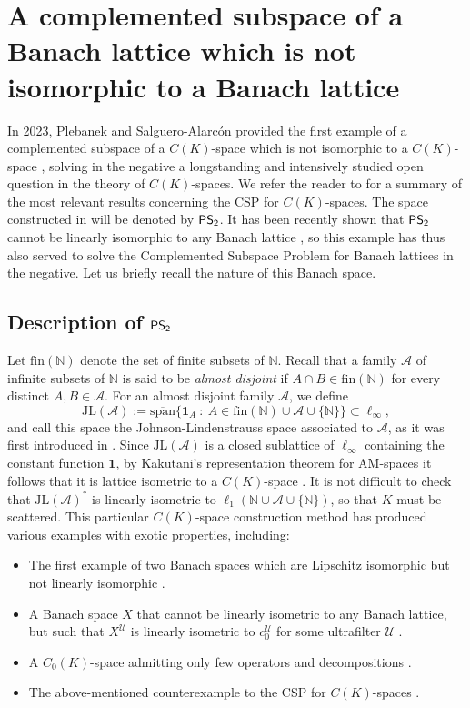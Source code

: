 \documentclass[11pt]{amsart}
\theoremstyle{definition}
\numberwithin{equation}{section}
\newcommand\PS{{\normalfont\textsf{PS}}_\textsf{2}}
\begin{document}
\section{A complemented subspace of a Banach lattice which is not isomorphic to a Banach lattice}\label{sec:PS2}



In 2023, Plebanek and Salguero-Alarcón provided the first example of a complemented subspace of a $C(K)$-space which is not isomorphic to a $C(K)$-space \cite{PS2}, solving in the negative a longstanding and intensively studied open question in the theory of $C(K)$-spaces. We refer the reader to \cite[Section 5]{Ros} for a summary of the most relevant results concerning the CSP for $C(K)$-spaces. The space constructed in \cite{PS2} will be denoted by $\PS$. It has been recently shown that $\PS$ cannot be linearly isomorphic to any Banach lattice \cite[Theorem 4.4]{dHMST23}, so this example has thus also served to solve the Complemented Subspace Problem for Banach lattices in the negative. Let us briefly recall the nature of this Banach space.

\subsection{Description of $\PS$} Let $\text{fin}(\mathbb N)$ denote the set of finite subsets of $\mathbb N$. Recall that a family $\mathcal{A}$ of infinite subsets of $\mathbb{N}$ is said to be \textit{almost disjoint} if $A\cap B\in \text{fin}(\mathbb N)$ for every distinct $A, B\in\mathcal{A}$. For an almost disjoint family $\mathcal{A}$, we define
$$
\text{JL}(\mathcal{A}):=\overline{\text{span}}\bigl\{\mathbf{1}_A\::\:A\in \text{fin}(\mathbb{N})\cup\mathcal{A}\cup\{\mathbb{N}\}\bigr\}\subset \ell_\infty,
$$
and call this space the Johnson-Lindenstrauss space associated to $\mathcal{A}$, as it was first introduced in \cite[Example 2]{JL1974}. Since $\text{JL}(\mathcal{A})$ is a closed sublattice of $\ell_\infty$ containing the constant function $\mathbf{1}$, by Kakutani's representation theorem for AM-spaces it follows that it is lattice isometric to a $C(K)$-space \cite[Theorem 1.b.6]{LT2-book}. It is not difficult to check that $\text{JL}(\mathcal{A})^*$ is linearly isometric to $\ell_1(\mathbb{N}\cup\mathcal{A}\cup\{\mathbb{N}\})$, so that $K$ must be scattered. This particular $C(K)$-space construction method has produced various examples with exotic properties, including:
\begin{itemize}
    \item The first example of two Banach spaces which are Lipschitz isomorphic but not linearly isomorphic \cite{AL}.
    \item A Banach space $X$ that cannot be linearly isometric to any Banach lattice, but such that $X^\mathcal{U}$ is linearly isometric to $c_0^\mathcal{U}$ for some ultrafilter $\mathcal{U}$ \cite{HHM83}.
    \item A $C_0(K)$-space admitting only few operators and decompositions \cite{KL}.
    \item The above-mentioned counterexample to the CSP for $C(K)$-spaces \cite{PS2}.
\end{itemize}
\end{document}
